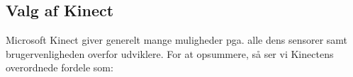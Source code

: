 %
%
%

\subsection{Valg af Kinect}\label{kinect:argumentation}
Microsoft Kinect giver generelt mange muligheder pga. alle dens sensorer samt brugervenligheden overfor udviklere.
For at opsummere, så ser vi Kinectens overordnede fordele som:

